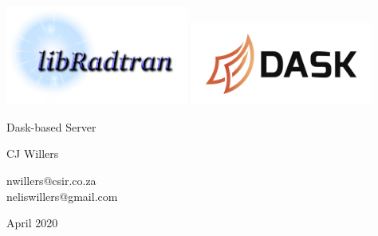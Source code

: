 
\thispagestyle{empty}

{
\sffamily
\centering
\large

~\vspace{\fill}

\vspace{2cm}
\includegraphics[width=0.45\textwidth]{pic/libradtran.png}
\includegraphics[width=0.45\textwidth]{pic/dask.png}

\vspace{3cm}
{\huge Dask-based \libradtran{} Server }

\vspace{1.5cm}

\vspace{1.5cm}
{\Large CJ Willers }

\vspace{2mm}
nwillers@csir.co.za\\
neliswillers@gmail.com


\vspace{\fill}

April 2020

}

\clearpage
\tableofcontents*

\clearpage
\listoffigures*

\clearpage


